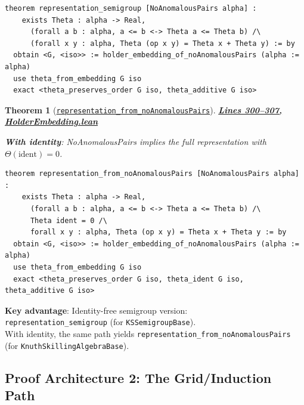 \documentclass[11pt]{article}
\newtheorem{theorem}{Theorem}[section]
\theoremstyle{definition}
\theoremstyle{remark}
\begin{document}
\begin{lstlisting}[caption={Identity-free representation theorem}]
theorem representation_semigroup [NoAnomalousPairs alpha] :
    exists Theta : alpha -> Real,
      (forall a b : alpha, a <= b <-> Theta a <= Theta b) /\
      (forall x y : alpha, Theta (op x y) = Theta x + Theta y) := by
  obtain <G, <iso>> := holder_embedding_of_noAnomalousPairs (alpha := alpha)
  use theta_from_embedding G iso
  exact <theta_preserves_order G iso, theta_additive G iso>
\end{lstlisting}

\begin{theorem}[\href{https://github.com/zariuq/ks-foundations-of-inference/blob/main/KnuthSkilling/Additive/Proofs/OrderedSemigroupEmbedding/HolderEmbedding.lean\#L302}{\texttt{representation\_from\_noAnomalousPairs}}]
\textbf{\href{https://github.com/zariuq/ks-foundations-of-inference/blob/main/KnuthSkilling/Additive/Proofs/OrderedSemigroupEmbedding/HolderEmbedding.lean\#L300-L307}{Lines 300--307, HolderEmbedding.lean}}

\textbf{With identity}: NoAnomalousPairs implies the full representation with $\Theta(\text{ident}) = 0$.
\end{theorem}

\begin{lstlisting}[caption={Representation with identity normalization}]
theorem representation_from_noAnomalousPairs [NoAnomalousPairs alpha] :
    exists Theta : alpha -> Real,
      (forall a b : alpha, a <= b <-> Theta a <= Theta b) /\
      Theta ident = 0 /\
      forall x y : alpha, Theta (op x y) = Theta x + Theta y := by
  obtain <G, <iso>> := holder_embedding_of_noAnomalousPairs (alpha := alpha)
  use theta_from_embedding G iso
  exact <theta_preserves_order G iso, theta_ident G iso, theta_additive G iso>
\end{lstlisting}

\textbf{Key advantage}: Identity-free semigroup version:\\
\texttt{representation\_semigroup} (for \texttt{KSSemigroupBase}).\\
With identity, the same path yields
\texttt{representation\_from\_}\linebreak\texttt{noAnomalousPairs} (for \texttt{KnuthSkillingAlgebraBase}).

\subsection{Proof Architecture 2: The Grid/Induction Path}
\end{document}

